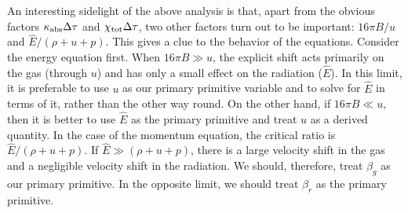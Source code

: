 \documentclass[12pt,preprint]{aastex}
\begin{document}
An interesting sidelight of the above analysis is that, apart from the
obvious factors $\kappa_{\rm abs}\Delta\tau$ and $\chi_{\rm
  tot}\Delta\tau$, two other factors turn out to be important: $16\pi
B/u$ and $\widehat{E}/(\rho+u+p)$. This gives a clue to the behavior
of the equations. Consider the energy equation first. When $16\pi B
\gg u$, the explicit shift acts primarily on the gas (through $u$) and
has only a small effect on the radiation ($\widehat{E}$). In this
limit, it is preferable to use $u$ as our primary primitive variable
and to solve for $\widehat{E}$ in terms of it, rather than the other
way round.  On the other hand, if $16\pi B \ll u$, then it is better
to use $\widehat{E}$ as the primary primitive and treat $u$ as a
derived quantity.  In the case of the momentum equation, the critical
ratio is $\widehat{E}/(\rho+u+p)$. If $\widehat{E} \gg (\rho+u+p)$,
there is a large velocity shift in the gas and a negligible velocity
shift in the radiation. We should, therefore, treat $\beta_g$ as our
primary primitive. In the opposite limit, we should treat $\beta_r$ as
the primary primitive.
\end{document}
